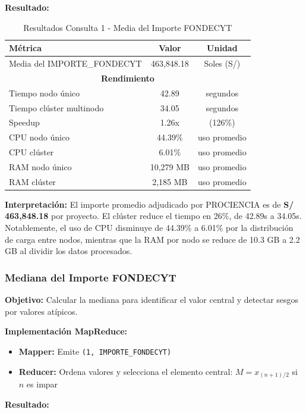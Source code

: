 \documentclass[12pt,a4paper]{article}
\begin{document}
\textbf{Resultado:}

\begin{table}[H]
\centering
\begin{tabular}{lcc}
\toprule
\textbf{Métrica} & \textbf{Valor} & \textbf{Unidad} \\
\midrule
Media del IMPORTE\_FONDECYT & 463,848.18 & Soles (S/) \\
\midrule
\multicolumn{3}{c}{\textbf{Rendimiento}} \\
\midrule
Tiempo nodo único & 42.89 & segundos \\
Tiempo clúster multinodo & 34.05 & segundos \\
Speedup & 1.26x & (126\%) \\
\midrule
CPU nodo único & 44.39\% & uso promedio \\
CPU clúster & 6.01\% & uso promedio \\
RAM nodo único & 10,279 MB & uso promedio \\
RAM clúster & 2,185 MB & uso promedio \\
\bottomrule
\end{tabular}
\caption{Resultados Consulta 1 - Media del Importe FONDECYT}
\label{tab:media}
\end{table}

\textbf{Interpretación:} El importe promedio adjudicado por PROCIENCIA es de \textbf{S/ 463,848.18} por proyecto. El clúster reduce el tiempo en 26\%, de 42.89s a 34.05s. Notablemente, el uso de CPU disminuye de 44.39\% a 6.01\% por la distribución de carga entre nodos, mientras que la RAM por nodo se reduce de 10.3 GB a 2.2 GB al dividir los datos procesados.

\subsubsection{Mediana del Importe FONDECYT}

\textbf{Objetivo:} Calcular la mediana para identificar el valor central y detectar sesgos por valores atípicos.

\textbf{Implementación MapReduce:}
\begin{itemize}
    \item \textbf{Mapper:} Emite \texttt{(1, IMPORTE\_FONDECYT)}
    \item \textbf{Reducer:} Ordena valores y selecciona el elemento central: $M = x_{(n+1)/2}$ si $n$ es impar
\end{itemize}

\textbf{Resultado:}
\end{document}
